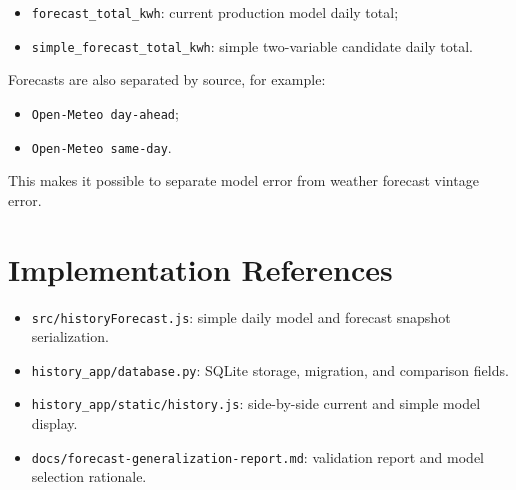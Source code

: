 \documentclass[11pt,a4paper]{article}
\begin{document}
\begin{itemize}
  \item \texttt{forecast\_total\_kwh}: current production model daily total;
  \item \texttt{simple\_forecast\_total\_kwh}: simple two-variable candidate daily total.
\end{itemize}

Forecasts are also separated by source, for example:

\begin{itemize}
  \item \texttt{Open-Meteo day-ahead};
  \item \texttt{Open-Meteo same-day}.
\end{itemize}

This makes it possible to separate model error from weather forecast vintage error.

\section{Implementation References}

\begin{itemize}
  \item \texttt{src/historyForecast.js}: simple daily model and forecast snapshot serialization.
  \item \texttt{history\_app/database.py}: SQLite storage, migration, and comparison fields.
  \item \texttt{history\_app/static/history.js}: side-by-side current and simple model display.
  \item \texttt{docs/forecast-generalization-report.md}: validation report and model selection rationale.
\end{itemize}
\end{document}
